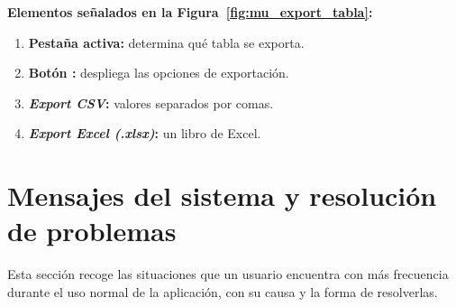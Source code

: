 \documentclass[11pt,a4paper]{article}
\newenvironment{senalamientos}[1]{%
  \par\noindent\textbf{Elementos se\~nalados en la Figura~\ref{#1}:}%
  \begin{enumerate}[label=(\arabic*),leftmargin=2.4em,itemsep=2pt,topsep=4pt]}
  {\end{enumerate}}
\begin{document}
    \begin{senalamientos}{fig:mu_export_tabla}
        \item \textbf{Pesta\~na activa:} determina qu\'e tabla se exporta.
        \item \textbf{Bot\'on \textbullet\textbullet\textbullet:} despliega las opciones de exportaci\'on.
        \item \textbf{\textit{Export CSV}:} valores separados por comas.
        \item \textbf{\textit{Export Excel (.xlsx)}:} un libro de Excel.
    \end{senalamientos}


\clearpage

\section{Mensajes del sistema y resoluci\'on de problemas}

Esta secci\'on recoge las situaciones que un usuario encuentra con m\'as frecuencia durante el uso normal de la aplicaci\'on, con su causa y la forma de resolverlas.
\end{document}
